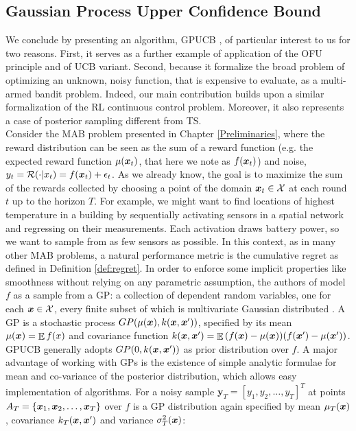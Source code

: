 \subsection{Gaussian Process Upper Confidence Bound}
We conclude by presenting an algorithm, \gls{GPUCB} \cite{srinivas2010gaussian}, of particular interest to us for two reasons. First, it serves as a further example of application of the \gls{OFU} principle and of \gls{UCB} variant. Second, because it formalize the broad problem of optimizing an unknown, noisy function, that is expensive to evaluate, as a multi-armed bandit problem. Indeed, our main contribution builds upon a similar formalization of the \gls{RL} continuous control problem. Moreover, it also represents a case of posterior sampling different from \gls{TS}. \\
Consider the \gls{MAB} problem presented in Chapter \ref{Preliminaries}, where the reward distribution can be seen as the sum of a reward function (e.g. the expected reward function $\mu(\boldsymbol{x}_t)$, that here we note as $f(\boldsymbol{x}_t)$) and noise, \ie $y_t = \mathcal{R}(\cdot|x_t) = f(\boldsymbol{x}_t) + \epsilon_t$. As we already know, the goal is to maximize the sum of the rewards collected by choosing a point of the domain $\boldsymbol{x}_t\in\mathcal{X}$ at each round $t$ up to the horizon $T$. For example, we might want to find locations of highest temperature in a building by sequentially activating sensors in a spatial network and regressing on their measurements. Each activation draws battery power, so we want to sample from as few sensors as possible.  In this context, as in many other \gls{MAB} problems, a natural performance metric is the cumulative regret as defined in Definition \ref{def:regret}. 
In order to enforce some implicit properties like smoothness without relying on any parametric assumption, the authors of \cite{srinivas2010gaussian} model $f$ as a sample from a \gls{GP}: a collection of dependent random variables, one for each $\boldsymbol{x}\in\mathcal{X}$, every finite subset of which is multivariate Gaussian distributed \cite{williams2006gaussian}. A \gls{GP} is a stochastic process $GP(\mu(\boldsymbol{x}), k(\boldsymbol{x},\boldsymbol{x}'))$, specified by its mean $\mu(\boldsymbol{x}) = \mathop{\mathbb{E}}{f(x)}$ and covariance function $k(\boldsymbol{x},\boldsymbol{x}') = \mathop{\mathbb{E}}{(f(\boldsymbol{x})-\mu(\boldsymbol{x}))(f(\boldsymbol{x}')-\mu(\boldsymbol{x}'))}$. \gls{GPUCB} generally adopts $GP(0,k(\boldsymbol{x},\boldsymbol{x}'))$ as prior distribution over $f$.  A major advantage of working with GPs is the existence of simple analytic formulae for mean and co-variance of the posterior distribution, which allows easy implementation of algorithms. For a noisy sample $\boldsymbol{y}_T = [y_1,y_2,\dots, y_T]^T$ at points $A_T = \{\boldsymbol{x}_1,\boldsymbol{x}_2,\dots,\boldsymbol{x}_T\}$ over $f$ is a GP distribution again specified by mean $\mu_T(\boldsymbol{x})$, covariance $k_T(\boldsymbol{x},\boldsymbol{x}')$ and variance $\sigma^2_T(\boldsymbol{x})$:

